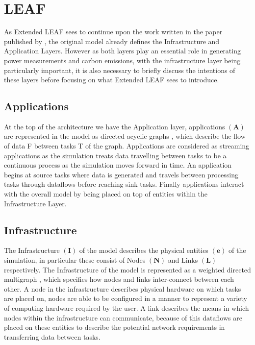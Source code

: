 \documentclass{l4proj}
\begin{document}
\section{LEAF}\label{sec:LEAF}
As Extended LEAF sees to continue upon the work written in the paper published by \cite{leaf2021}, the original model already defines the Infrastructure and Application Layers.
However as both layers play an essential role in generating power measurements and carbon emissions, with the infrastructure layer being particularly important, it is also necessary to briefly discuss the intentions of these layers before focusing on what Extended LEAF sees to introduce.

\subsection{Applications}\label{subsec:applications}
At the top of the architecture we have the Application layer, applications $\mathbf{(A)}$ are represented in the model as directed acyclic graphs \citep{leaf2021}, which describe the flow of data F between tasks T of the graph.
Applications are considered as streaming applications as the simulation treats data travelling between tasks to be a continuous process as the simulation moves forward in time.
An application begins at source tasks where data is generated and travels between processing tasks through dataflows before reaching sink tasks.
Finally applications interact with the overall model by being placed on top of entities within the Infrastructure Layer.

\subsection{Infrastructure}\label{subsec:infrastructure}
The Infrastructure $\mathbf{(I)}$ of the model describes the physical entities $\mathbf{(e)}$ of the simulation, in particular these consist of Nodes $\mathbf{(N)}$ and Links $\mathbf{(L)}$ respectively.
The Infrastructure of the model is represented as a weighted directed multigraph \citep{leaf2021}, which specifies how nodes and links inter-connect between each other.
A node in the infrastructure describes physical hardware on which tasks are placed on, nodes are able to be configured in a manner to represent a variety of computing hardware required by the user.
A link describes the means in which nodes within the infrastructure can communicate, because of this dataflows are placed on these entities to describe the potential network requirements in transferring data between tasks.
\end{document}
